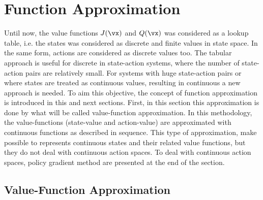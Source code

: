

\section{Function Approximation}
  \label{sec:funcApprox}

Until now, the value functions $J(\vx)$ and  $Q(\vx)$ was considered as a lookup table, i.e. the states was considered as  discrete and finite values in state space. In the same form, actions are considered as discrete values too. The tabular approach is useful for discrete in state-action systems, where the number of state-action pairs are relatively small. For systems with huge state-action pairs or where states are treated as continuous values, resulting in continuous a new approach is needed. To aim this objective, the concept of function approximation is introduced in this and next sections. First, in this section this approximation is done by what will be called value-function approximation. In this methodology, the value-functions (state-value and action-value) are approximated with continuous functions as described in sequence.
This type of approximation, make possible to represents continuous states and their related value functions, but they do not deal with continuous action spaces. To deal with continuous action spaces, policy gradient method are presented at the end of the section.


\subsection{Value-Function Approximation}
  \label{sec:valFunApp}

